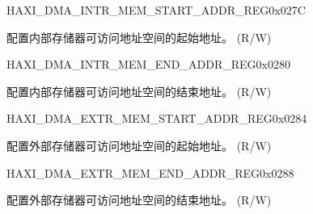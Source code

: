 \begin{register}{H}{AXI\_DMA\_INTR\_MEM\_START\_ADDR\_REG}{0x027C}\label{regdesc:AXIDMAINTRMEMSTARTADDRREG}
%
\regnewline%
\begin{regdesc}\begin{reglist}
\label{fielddesc:AXIDMAACCESSINTRMEMSTARTADDR}\item [AXI\_DMA\_ACCESS\_INTR\_MEM\_START\_ADDR] 配置内部存储器可访问地址空间的起始地址。 (R/W)
\end{reglist}\end{regdesc}
\end{register}


\begin{register}{H}{AXI\_DMA\_INTR\_MEM\_END\_ADDR\_REG}{0x0280}\label{regdesc:AXIDMAINTRMEMENDADDRREG}
%
\regnewline%
\begin{regdesc}\begin{reglist}
\label{fielddesc:AXIDMAACCESSINTRMEMENDADDR}\item [AXI\_DMA\_ACCESS\_INTR\_MEM\_END\_ADDR] 配置内部存储器可访问地址空间的结束地址。 (R/W)
\end{reglist}\end{regdesc}
\end{register}


\begin{register}{H}{AXI\_DMA\_EXTR\_MEM\_START\_ADDR\_REG}{0x0284}\label{regdesc:AXIDMAEXTRMEMSTARTADDRREG}
%
\regnewline%
\begin{regdesc}\begin{reglist}
\label{fielddesc:AXIDMAACCESSEXTRMEMSTARTADDR}\item [AXI\_DMA\_ACCESS\_EXTR\_MEM\_START\_ADDR] 配置外部存储器可访问地址空间的起始地址。 (R/W)
\end{reglist}\end{regdesc}
\end{register}


\begin{register}{H}{AXI\_DMA\_EXTR\_MEM\_END\_ADDR\_REG}{0x0288}\label{regdesc:AXIDMAEXTRMEMENDADDRREG}
%
\regnewline%
\begin{regdesc}\begin{reglist}
\label{fielddesc:AXIDMAACCESSEXTRMEMENDADDR}\item [AXI\_DMA\_ACCESS\_EXTR\_MEM\_END\_ADDR] 配置外部存储器可访问地址空间的结束地址。 (R/W)
\end{reglist}\end{regdesc}
\end{register}



